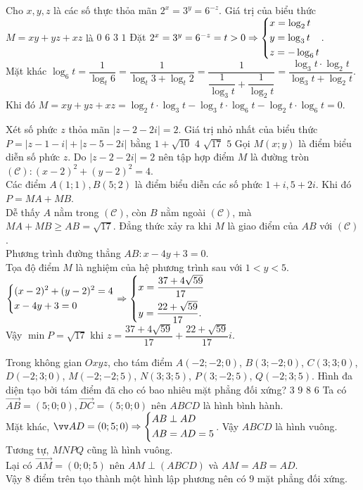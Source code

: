 \begin{ex}%
Cho $x, y, z$ là các số thực thỏa mãn $2^x=3^y=6^{-z}$. Giá trị của biểu thức $M=xy+yz+xz$ là
\choice
{\True $0$}
{$6$}
{$3$}
{$1$}
\loigiai
{
Đặt $2^x=3^y=6^{-z}=t>0\Rightarrow\left\{\begin{aligned}&x=\log_2t\\&y=\log_3t\\&z=-\log_6t\end{aligned}\right.$.\\Mặt khác $\log_6t=\dfrac{1}{\log_t6}=\dfrac{1}{\log_t3+\log_t2}=\dfrac{1}{\dfrac{1}{\log_3t}+\dfrac{1}{\log_2t}}=\dfrac{\log_3t\cdot\log_2t}{\log_3t+\log_2t}$.\\
Khi đó $M=xy+yz+xz=\log_2t\cdot\log_3t-\log_3t\cdot\log_6t-\log_2t\cdot\log_6t=0$.
}
\end{ex}

\begin{ex}%
Xét số phức $z$ thỏa mãn $|z-2-2i|=2$. Giá trị nhỏ nhất của biểu thức $P=|z-1-i|+|z-5-2i|$ bằng
\choice
{$1+\sqrt{10}$}
{$4$}
{\True $\sqrt{17}$}
{$5$}
\loigiai
{
Gọi $M(x;y)$ là điểm biểu diễn số phức $z$. Do $|z-2-2i|=2$ nên tập hợp điểm $M$ là đường tròn $(\mathscr{C}): (x-2)^2+(y-2)^2=4$.\\Các điểm $A(1;1), B(5;2)$ là điểm biểu diễn các số phức $1+i, 5+2i$. Khi đó $P=MA+MB$.\\Dễ thấy $A$ nằm trong $(\mathscr{C})$, còn $B$ nằm ngoài $(\mathscr{C})$, mà $MA+MB\geq AB=\sqrt{17}$. Đẳng thức xảy ra khi $M$ là giao điểm của $AB$ với $(\mathscr{C})$.\\Phương trình đường thẳng $AB: x-4y+3=0$.\\Tọa độ điểm $M$ là nghiệm của hệ phương trình sau với $1<y<5$.\\ $\left\{\begin{aligned}&(x-2)^2+(y-2)^2=4\\&x-4y+3=0\end{aligned}\right.\Rightarrow\left\{\begin{aligned}&x=\dfrac{37+4\sqrt{59}}{17}\\&y=\dfrac{22+\sqrt{59}}{17}.\end{aligned}\right.$\\
Vậy $\min P=\sqrt{17}$ khi $z=\dfrac{37+4\sqrt{59}}{17}+\dfrac{22+\sqrt{59}}{17}i$.
}
\end{ex}

\begin{ex}%
Trong không gian $Oxyz$, cho tám điểm $A(-2;-2;0)$, $B(3;-2;0)$, $C(3;3;0)$, $D(-2;3;0)$, $M(-2;-2;5)$, $N(3;3;5)$, $P(3;-2;5)$, $Q(-2;3;5)$. Hình đa diện tạo bởi tám điểm đã cho có bao nhiêu mặt phẳng đối xứng?
\choice
{$3$}
{\True $9$}
{$8$}
{$6$}
\loigiai
{
Ta có $\vec{AB}=(5;0;0), \vec{DC}=(5;0;0)$ nên $ABCD$ là hình bình hành.\\Mặt khác, $\vec{AD}=(0;5;0)\Rightarrow\heva{&AB\perp AD\\&AB=AD=5}$. Vậy $ABCD$ là hình vuông.\\Tương tự, $MNPQ$ cũng là hình vuông.\\Lại có $\vec{AM}=(0;0;5)$ nên $AM\perp (ABCD)$ và $AM=AB=AD$.\\Vậy $8$ điểm trên tạo thành một hình lập phương nên có $9$ mặt phẳng đối xứng.
}
\end{ex}

